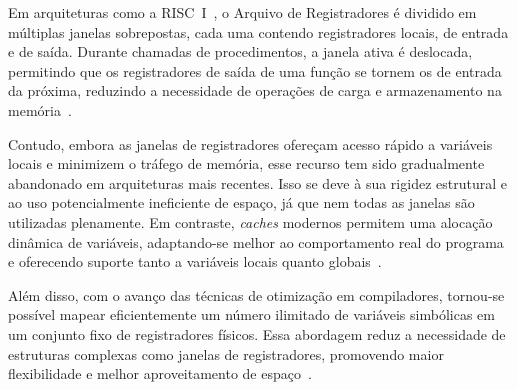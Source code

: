 \documentclass[
	12pt,				%
	openright,			%
	oneside,			%
	a4paper,			%
	english,			%
	french,				%
	spanish,			%
	brazil,				%
	]{abntex2}
\begin{document}
Em arquiteturas como a RISC~I~\cite[p.7-10]{peek_vlsi_1983}, o Arquivo de Registradores é dividido em múltiplas janelas sobrepostas, cada uma contendo registradores locais, de entrada e de saída. Durante chamadas de procedimentos, a janela ativa é deslocada, permitindo que os registradores de saída de uma função se tornem os de entrada da próxima, reduzindo a necessidade de operações de carga e armazenamento na memória~\cite{peek_vlsi_1983}.

Contudo, embora as janelas de registradores ofereçam acesso rápido a variáveis locais e minimizem o tráfego de memória, esse recurso tem sido gradualmente abandonado em arquiteturas mais recentes. Isso se deve à sua rigidez estrutural e ao uso potencialmente ineficiente de espaço, já que nem todas as janelas são utilizadas plenamente. Em contraste, \textit{caches} modernos permitem uma alocação dinâmica de variáveis, adaptando-se melhor ao comportamento real do programa e oferecendo suporte tanto a variáveis locais quanto globais~\cite[p.43-44]{stallings_reduced_1988}.

Além disso, com o avanço das técnicas de otimização em compiladores, tornou-se possível mapear eficientemente um número ilimitado de variáveis simbólicas em um conjunto fixo de registradores físicos. Essa abordagem reduz a necessidade de estruturas complexas como janelas de registradores, promovendo maior flexibilidade e melhor aproveitamento de espaço~\cite[p.44]{stallings_reduced_1988}.
\end{document}
